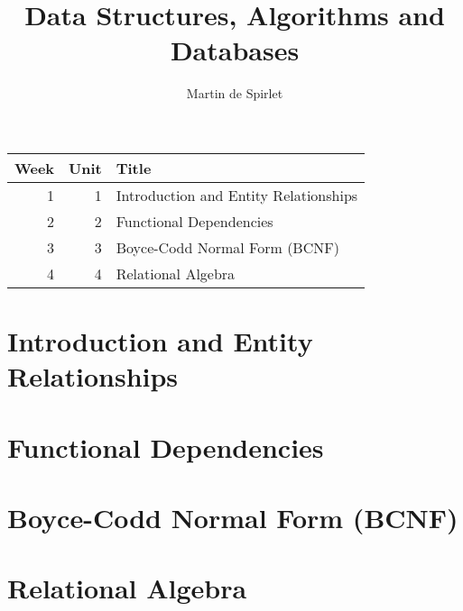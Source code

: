 \documentclass[
  11pt,
  a4paper,
]{article}
\title{Data Structures, Algorithms and Databases}
\author{Martin de Spirlet}
\date{}
\begin{document}

\maketitle

\vspace*{\fill}

\begin{table}[htp]
  \centering
  \begin{tabular}{rrl}
    \toprule
    Week & Unit & Title \\
    \midrule
    1 & 1 & Introduction and Entity Relationships \\
    2 & 2 & Functional Dependencies \\
    3 & 3 & Boyce-Codd Normal Form (BCNF) \\
    4 & 4 & Relational Algebra \\
    \bottomrule
  \end{tabular}
\end{table}

\vspace*{\fill}
\addvspace{1in}

\clearpage


\section{Introduction and Entity Relationships}


\section{Functional Dependencies}


\section{Boyce-Codd Normal Form (BCNF)}


\section{Relational Algebra}

\end{document}
